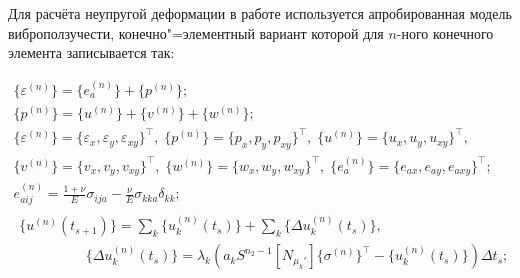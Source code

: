 Для расчёта неупругой деформации в работе используется апробированная \cite{dubovova:6, dubovova:7} модель виброползучести, конечно"=элементный вариант которой для $n$-ного конечного элемента записывается так:









\begin{gather}

\label{eq:4:3:5}

\{\varepsilon^{(n)}\} = \{e_{a}^{(n)}\} +  \{p^{(n)}\}; \\

\{p^{(n)}\}=\{u^{(n)}\}+\{v^{(n)}\}+\{w^{(n)}\};\\

\{\varepsilon^{(n)}\}=\{\varepsilon_x, \varepsilon_y, \varepsilon_{xy}\}^\top , \;

\{p^{(n)}\}=\{p_x, p_y, p_{xy}\}^\top , \;

\{u^{(n)}\}=\{u_x, u_y, u_{xy}\}^\top , \\

\{v^{(n)}\}=\{v_x, v_y, v_{xy}\}^\top ,\;

\{w^{(n)}\}=\{w_x, w_y, w_{xy}\}^\top ,\;

\{e_{a}^{(n)}\}=\{e_{ax}, e_{ay}, e_{axy}\}^\top ;\\

e_{aij}^{(n)} = \frac{1+\nu}{E}\sigma_{ija}-\frac{\nu}{E}\sigma_{kka}\delta_{kk} ;\\

\label{eq:4:3:6}

\begin{array}{l}

\displaystyle

\{u^{(n)}(t_{s+1})\}= \sum\limits_{k}\{u^{(n)}_k(t_{s})\}+

\sum\limits_{k}\{\Delta u^{(n)}_k(t_{s})\},

\\

\hspace{2cm}

\displaystyle \{\Delta u_k^{(n)}(t_s) \}=\lambda_k\left(a_k

S^{n_2-1} [N_{\mu_k'}] \{\sigma^{(n)}\}^\top  - \{u_k^{(n)}(t_s)\}

\right) \Delta t_s;

\end{array}

\\


\end{gather}

